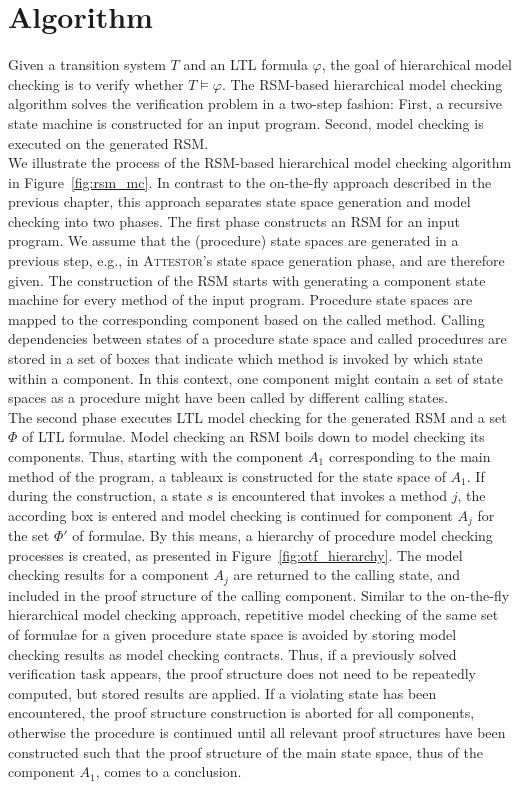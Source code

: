 \documentclass[a4paper, 12pt, twoside]{report}
\begin{document}
	\section{Algorithm}
	
	Given a transition system $T$ and an LTL formula $\varphi$, the goal of hierarchical model checking is to verify whether $T \models \varphi$. The RSM-based hierarchical model checking algorithm solves the verification problem in a two-step fashion: First, a recursive state machine is constructed for an input program. Second, model checking is executed on the generated RSM.\\
	
	We illustrate the process of the RSM-based hierarchical model checking algorithm in Figure~\ref{fig:rsm_mc}. In contrast to the on-the-fly approach described in the previous chapter, this approach separates state space generation and model checking into two phases. The first phase constructs an RSM for an input program. We assume that the (procedure) state spaces are generated in a previous step, e.g., in \textsc{Attestor}'s state space generation phase, and are therefore given. The construction of the RSM starts with generating a component state machine for every method of the input program. Procedure state spaces are mapped to the corresponding component based on the called method. Calling dependencies between states of a procedure state space and called procedures are stored in a set of boxes that indicate which method is invoked by which state within a component. In this context, one component might contain a set of state spaces as a procedure might have been called by different calling states.\\
	
	The second phase executes LTL model checking for the generated RSM and a set $\Phi$ of LTL formulae. Model checking an RSM boils down to model checking its components. Thus, starting with the component $A_1$ corresponding to the main method of the program, a tableaux is constructed for the state space of $A_1$. If during the construction, a state $s$ is encountered that invokes a method $j$, the according box is entered and model checking is continued for component $A_j$ for the set $\Phi'$ of formulae. By this means, a hierarchy of procedure model checking processes is created, as presented in Figure~\ref{fig:otf_hierarchy}. The model checking results for a component $A_j$ are returned to the calling state, and included in the proof structure of the calling component. Similar to the on-the-fly hierarchical model checking approach, repetitive model checking of the same set of formulae for a given procedure state space is avoided by storing model checking results as model checking contracts. Thus, if a previously solved verification task appears, the proof structure does not need to be repeatedly computed, but stored results are applied. If a violating state has been encountered, the proof structure construction is aborted for all components, otherwise the procedure is continued until all relevant proof structures have been constructed such that the proof structure of the main state space, thus of the component $A_1$, comes to a conclusion. 
	
\end{document}
